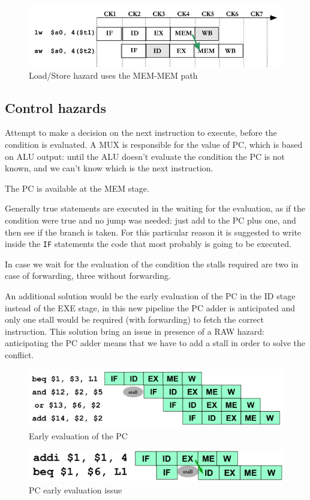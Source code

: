 \begin{figure}[h]
    \centering
    \includegraphics[scale=0.5]{images/load-store-hazard}
    \caption{Load/Store hazard uses the MEM-MEM path}
    \label{fig:load-store-hazard}
\end{figure}


\subsection{Control hazards}\label{subsec:control-hazards}
Attempt to make a decision on the next instruction to execute, before the condition is evaluated.
A MUX is responsible for the value of PC, which is based on ALU output: until the ALU doesn't evaluate the
condition the PC is not known, and we can't know which is the next instruction.

The PC is available at the MEM stage.

Generally true statements are executed in the waiting for the evaluation, as if the condition
were true and no jump was needed: just add to the PC plus one, and then see if the branch is taken.
For this particular reason it is suggested to write inside the \verb|IF| statements the code that most probably is
going to be executed.

In case we wait for the evaluation of the condition the stalls required are two in case of forwarding, three without forwarding.

An additional solution would be the early evaluation of the PC in the ID stage instead of the EXE stage, in this new
pipeline the PC adder is anticipated and only one stall would be required (with forwarding) to fetch the correct instruction.
This solution bring an issue in presence of a RAW hazard: anticipating the PC adder means that we have to add a stall
in order to solve the conflict.

\begin{figure}[h]
    \centering
    \includegraphics[scale = 0.4]{images/pc-early-evaluation}
    \caption{Early evaluation of the PC}
    \label{fig:pc-early-evaluation}
\end{figure}

\begin{figure}[h]
    \centering
    \includegraphics[scale = 0.4]{images/pc-early-evalutation-issue}
    \caption{PC early evaluation issue}
    \label{fig:pc-early-evaluation-issue}
\end{figure}